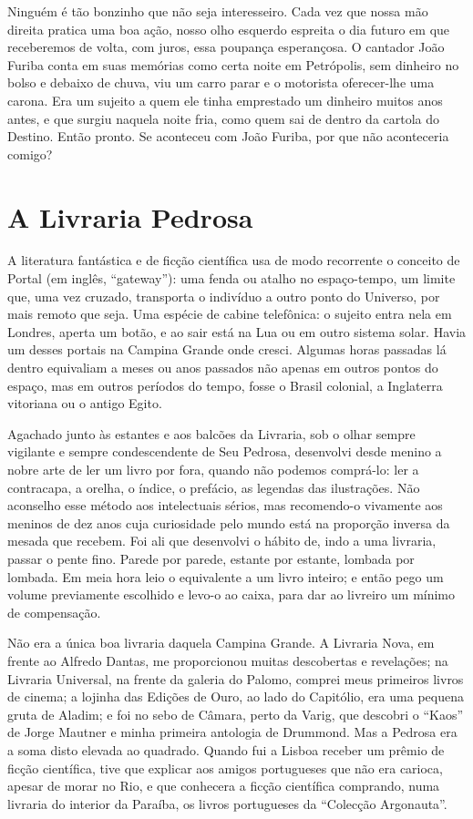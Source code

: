 Ninguém é tão bonzinho que não seja interesseiro. Cada vez que nossa
mão direita pratica uma boa ação, nosso olho esquerdo espreita o dia
futuro em que receberemos de volta, com juros, essa poupança
esperançosa. O cantador João Furiba conta em suas memórias como certa
noite em Petrópolis, sem dinheiro no bolso e debaixo de chuva, viu um
carro parar e o motorista oferecer-lhe uma carona. Era um sujeito a
quem ele tinha emprestado um dinheiro muitos anos antes, e que surgiu
naquela noite fria, como quem sai de dentro da cartola do Destino.
Então pronto. Se aconteceu com João Furiba, por que não aconteceria
comigo?

\chapter{A Livraria Pedrosa}

A literatura fantástica e de ficção científica usa de modo recorrente
o conceito de Portal (em inglês, “gateway”): uma fenda ou atalho no
espaço-tempo, um limite que, uma vez cruzado, transporta o indivíduo
a outro ponto do Universo, por mais remoto que seja. Uma espécie de
cabine telefônica: o sujeito entra nela em Londres, aperta um botão,
e ao sair está na Lua ou em outro sistema solar.  Havia um desses
portais na Campina Grande onde cresci. Algumas horas passadas lá
dentro equivaliam a meses ou anos passados não apenas em outros
pontos do espaço, mas em outros períodos do tempo, fosse o Brasil
colonial, a Inglaterra vitoriana ou o antigo Egito.

Agachado junto às estantes e aos balcões da Livraria, sob o olhar
sempre vigilante e sempre condescendente de Seu Pedrosa, desenvolvi
desde menino a nobre arte de ler um livro por fora, quando não
podemos comprá-lo: ler a contracapa, a orelha, o índice, o prefácio,
as legendas das ilustrações. Não aconselho esse método aos
intelectuais sérios, mas recomendo-o vivamente aos meninos de dez
anos cuja curiosidade pelo mundo está na proporção inversa da mesada
que recebem. Foi ali que desenvolvi o hábito de, indo a uma livraria,
passar o pente fino. Parede por parede, estante por estante, lombada
por lombada. Em meia hora leio o equivalente a um livro inteiro; e
então pego um volume previamente escolhido e levo-o ao caixa, para
dar ao livreiro um mínimo de compensação.

Não era a única boa livraria daquela Campina Grande. A Livraria Nova,
em frente ao Alfredo Dantas, me proporcionou muitas descobertas e
revelações; na Livraria Universal, na frente da galeria do Palomo,
comprei meus primeiros livros de cinema; a lojinha das Edições de
Ouro, ao lado do Capitólio, era uma pequena gruta de Aladim; e foi no
sebo de Câmara, perto da Varig, que descobri o “Kaos” de Jorge
Mautner e minha primeira antologia de Drummond. Mas a Pedrosa era a
soma disto elevada ao quadrado. Quando fui a Lisboa receber um prêmio
de ficção científica, tive que explicar aos amigos portugueses que
não era carioca, apesar de morar no Rio, e que conhecera a ficção
científica comprando, numa livraria do interior da Paraíba, os livros
portugueses da “Colecção Argonauta”.

